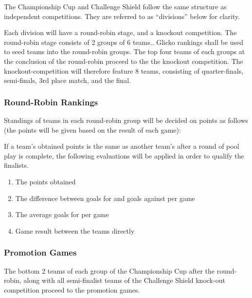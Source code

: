 The Championship Cup and Challenge Shield follow the same structure as independent competitions. They are referred to as ``divisions'' below for clarity.

Each division will have a round-robin stage, and a knockout competition. The round-robin stage consists of 2 groups of 6 teams.. Glicko rankings shall be used to seed teams into the round-robin groups. The top four teams of each groups at the conclusion of the round-robin proceed to the the knockout competition.  The knockout-competition will therefore feature 8 teams, consisting of quarter-finals, semi-finals, 3rd place match, and the final.

\subsubsection{Round-Robin Rankings}
\label{sec:round-robin-rankings}

Standings of teams in each round-robin group will be decided on points as follows (the points will be given based on the result of each game):


If a team's obtained points is the same as another team's after a round of pool play is complete, the following evaluations will be applied in order to qualify the finalists.
\begin{enumerate}

\item The points obtained

\item The difference between goals for and goals against per game

\item The average goals for per game

\item Game result between the teams directly

\end{enumerate}

\subsubsection{Promotion Games}

The bottom 2 teams of each group of the Championship Cup after the round-robin, along with all semi-finalist teams of the Challenge Shield knock-out competition proceed to the promotion games.

